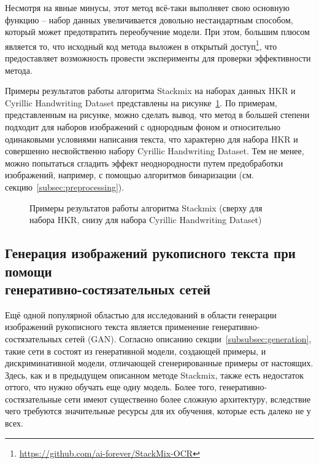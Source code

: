 Несмотря на явные минусы, этот метод всё-таки выполняет свою основную функцию -- набор данных увеличивается довольно
нестандартным способом, который может предотвратить переобучение модели.
При этом, большим плюсом является то, что исходный код метода выложен в открытый доступ\footnote{\url{https://github.com/ai-forever/StackMix-OCR}},
что предоставляет возможность провести эксперименты для проверки эффективности метода.

Примеры результатов работы алгоритма Stackmix на наборах данных HKR и Cyrillic Handwriting Dataset представлены на рисунке~\ref{fig:stackmix_example}.
По примерам, представленным на рисунке, можно сделать вывод, что метод в большей степени подходит для наборов изображений с однородным фоном и
относительно одинаковыми условиями написания текста, что характерно для набора HKR и совершенно несвойственно набору Cyrillic Handwriting Dataset.
Тем не менее, можно попытаться сгладить эффект неоднородности путем предобработки изображений, например, с помощью алгоритмов бинаризации (см. секцию~\ref{subsec:preprocessing}).

\begin{figure}[h!]
    \centering
    \caption{Примеры результатов работы алгоритма Stackmix (сверху для набора HKR, снизу для набора Cyrillic Handwriting Dataset)}
    \label{fig:stackmix_example}
\end{figure}


\subsection{Генерация изображений рукописного текста при помощи\\генеративно-состязательных сетей}
\label{subsec:gan}

Ещё одной популярной областью для исследований в области генерации изображений рукописного текста является применение генеративно-состязательных сетей (GAN).
Согласно описанию секции~\ref{subsubsec:generation}, такие сети в состоят из генеративной модели, создающей примеры,
и дискриминативной модели, отличающей сгенерированные примеры от настоящих.
Здесь, как и в предыдущем описанном методе Stackmix, также есть недостаток оттого, что нужно обучать еще одну модель.
Более того, генеративно-состязательные сети имеют существенно более сложную архитектуру,
вследствие чего требуются значительные ресурсы для их обучения, которые есть далеко не у всех.

